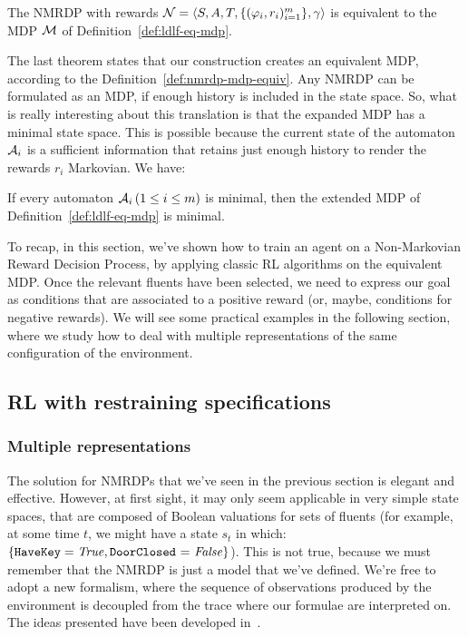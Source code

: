 \begin{theorem}
	\cite{bib:degiacomo-logic-nmrdp} The NMRDP with \ldl{} rewards $\mathcal{N} =
	{\langle S, A, T, \{(\varphi_i, r_i)_{i=1}^m\}, \gamma \rangle}$ is
	equivalent to the MDP $\mathcal{M}$ of Definition~\ref{def:ldlf-eq-mdp}.
\end{theorem}
The last theorem states that our construction creates an equivalent MDP,
according to the Definition~\ref{def:nmrdp-mdp-equiv}. Any NMRDP can be
formulated as an MDP, if enough history is included in the state space. So,
what is really interesting about this translation is that the expanded MDP has
a minimal state space. This is possible because the current state of the
automaton~$\mathcal{A}_i$ is a sufficient information that retains just enough
history to render the rewards $r_i$ Markovian. We have:
\begin{theorem}
	\cite{bib:degiacomo-logic-nmrdp} If every automaton $\mathcal{A}_i \,(1 \le i
	\le m)$ is minimal, then the extended MDP of
	Definition~\ref{def:ldlf-eq-mdp} is minimal.
\end{theorem}

To recap, in this section, we've shown how to train an agent on a
Non-Markovian Reward Decision Process, by applying classic RL algorithms on
the equivalent MDP. Once the relevant fluents have been selected, we need to
express our goal as \ldl{} conditions that are associated to a positive reward
(or, maybe, conditions for negative rewards). We will see some practical
examples in the following section, where we study how to deal with multiple
representations of the same configuration of the environment. 


\subsection[RL with LDLf restraining specifications]%
{RL with \ldl{} restraining specifications}

\label{sec:rb}

\subsubsection{Multiple representations}

The solution for NMRDPs that we've seen in the previous section is elegant and
effective. However, at first sight, it may only seem applicable in very simple
state spaces, that are composed of Boolean valuations for sets of fluents
(for example, at some time $t$, we might have a state $s_t$ in which:
$\{\text{\texttt{HaveKey}} = \text{\textit{True}}, \text{\texttt{DoorClosed} =
\text{\textit{False}}}\}$). This is not true, because we must remember that the NMRDP
is just a model that we've defined. We're free to adopt a new formalism, where
the sequence of observations produced by the environment is decoupled from the
trace where our formulae are interpreted on. The ideas presented have been
developed in~\cite{bib:bolt}.

